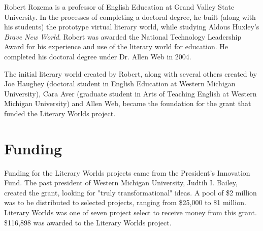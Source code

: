\documentclass[12pt, letterpaper]{report}
\begin{document}
\par
Robert Rozema is a professor of English Education at Grand Valley State University.  In the processes of completing a doctoral degree, he built (along with his students) the prototype virtual literary world, while studying Aldous Huxley's \textit{Brave New World}. Robert was awarded the National Technology Leadership Award for his experience and use of the literary world for education.  He completed his doctoral degree under Dr. Allen Web in 2004.

\par
The initial literary world created by Robert, along with several others created by Joe Haughey (doctoral student in English Education at Western Michigan University), Cara Aver (graduate student in Arts of Teaching English at Western Michigan University) and Allen Web, became the foundation for the grant that funded the Literary Worlds project.\cite{VirtWorldsTech}

\section{Funding}
\par
Funding for the Literary Worlds projects came from the President's Innovation Fund.  The past president of Western Michigan University, Judtih I. Bailey, created the grant, looking for "truly transformational" ideas. A pool of \$2 million was to be distributed to selected projects, ranging from \$25,000 to \$1 million. Literary Worlds was one of seven project select to receive money from this grant. \$116,898 was awarded to the Literary Worlds project.\cite{VirtWorldsTech}
\end{document}
